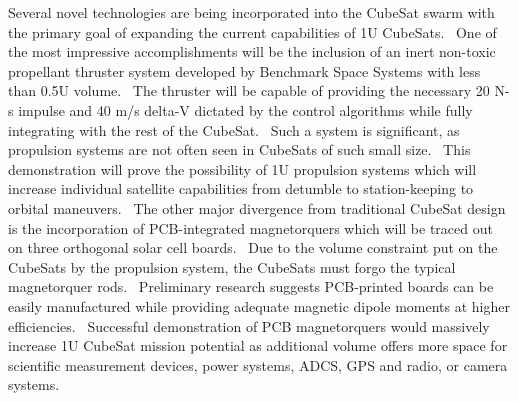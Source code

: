 Several novel technologies are being incorporated into the CubeSat
swarm with the primary goal of expanding the current capabilities of
1U CubeSats.  One of the most impressive accomplishments will be the
inclusion of an inert non-toxic propellant thruster system developed
by Benchmark Space Systems with less than 0.5U volume.  The thruster
will be capable of providing the necessary 20 N-s impulse and 40 m/s
delta-V dictated by the control algorithms while fully integrating
with the rest of the CubeSat.  Such a system is significant, as
propulsion systems are not often seen in CubeSats of such small size. 
This demonstration will prove the possibility of 1U propulsion systems
which will increase individual satellite capabilities from detumble to
station-keeping to orbital maneuvers.  The other major divergence from
traditional CubeSat design is the incorporation of PCB-integrated
magnetorquers which will be traced out on three orthogonal solar cell
boards.  Due to the volume constraint put on the CubeSats by the
propulsion system, the CubeSats must forgo the typical magnetorquer
rods.  Preliminary research suggests PCB-printed boards can be easily
manufactured while providing adequate magnetic dipole moments at
higher efficiencies.  Successful demonstration of PCB magnetorquers
would massively increase 1U CubeSat mission potential as additional
volume offers more space for scientific measurement devices, power
systems, ADCS, GPS and radio, or camera systems.
